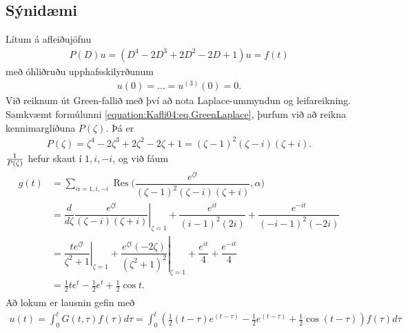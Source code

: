 \documentclass[a4paper,10pt,icelandic]{sphinxmanual}
\begin{document}
\subsection{Sýnidæmi}
\label{\detokenize{Kafli04:id4}}
Lítum á afleiðujöfnu
\begin{equation*}
\begin{split}P(D)u=(D^4-2 D^3+2 D^2-2 D+1)u=f(t)\end{split}
\end{equation*}
með óhliðruðu upphafsskilyrðunum
\begin{equation*}
\begin{split}u(0)=\dots=u^{(3)}(0)=0.\end{split}
\end{equation*}
Við reiknum út Green-fallið með því að nota Laplace-ummyndun og leifareikning. Samkvæmt formúlunni \eqref{equation:Kafli04:eq.GreenLaplace},  þurfum við að reikna kennimargliðuna \(P(\zeta)\). Þá er
\begin{equation*}
\begin{split}P(\zeta)= \zeta^ 4-2\zeta^ 3+2\zeta^ 2-2\zeta+1 = (\zeta-1)^ 2(\zeta-i)(\zeta+i).\end{split}
\end{equation*}
\({1\over P(\zeta)}\) hefur skaut í \(1, i, -i\), og við fáum
\begin{equation*}
\begin{split}\begin{aligned}
g(t)&= \sum\limits_{\alpha=1,i,-i} {{\operatorname{Res}}}\bigg(\dfrac{e^{\zeta t}}
{(\zeta-1)^ 2(\zeta-i)(\zeta+i)},\alpha\bigg)\\
&= \left.\dfrac d{d\zeta} \dfrac{e^{\zeta t}}{(\zeta-i)(\zeta+i)}
\right|_{\zeta=1} + \dfrac{e^{it}}{(i-1)^ 2(2i)} +
\dfrac{e^{-it}}{(-i-1)^ 2(-2i)}\\
&= \left.\dfrac{te^{\zeta t}}{\zeta^ 2+1}\right|_{\zeta=1}
+\left.\dfrac{e^{\zeta t}(-2\zeta)}{(\zeta^ 2+1)^ 2}\right|_{\zeta=1}
+\dfrac{e^{it}}4+\dfrac{e^{-it}}4\\
&=\tfrac 12 te^ t -\tfrac 12 e^ t +\tfrac 12\cos t.\end{aligned}\end{split}
\end{equation*}
Að lokum er lausnin gefin með
\begin{equation*}
\begin{split}u(t) = \int_0^t G(t,\tau) f(\tau) d\tau = \int_0^t \left(\tfrac 12 (t-\tau)e^{(t-\tau)} -\tfrac 12 e^{(t-\tau)} +\tfrac 12\cos (t-\tau)\right) f(\tau) d\tau\end{split}
\end{equation*}
\end{document}
